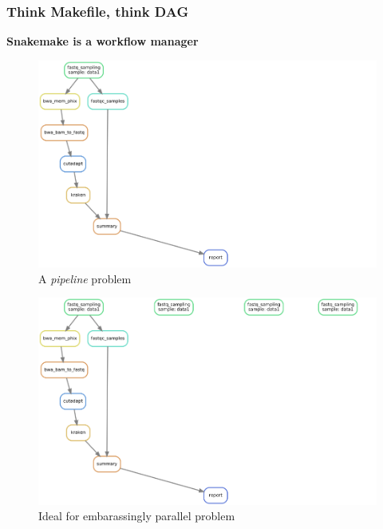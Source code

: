 \documentclass{beamer}
\begin{document}
\begin{frame}
\frametitle{Think Makefile, think DAG}
    
   \centering \textbf{Snakemake is a workflow manager}\\
      
        {
            \begin{figure}
                \includegraphics[width=\textwidth,height=0.6\textheight]{images/dag_0.png}
                \caption[1]{A \textit{pipeline} problem}
            \end{figure}                
        }
        {
            \begin{figure}
                \includegraphics[width=\textwidth,height=0.6\textheight]{images/dag_1.png}
                \caption[1]{Ideal for embarassingly parallel problem}
            \end{figure}                
        } 
        {
            \begin{figure}

\end{figure}}
\end{frame}
\end{document}
